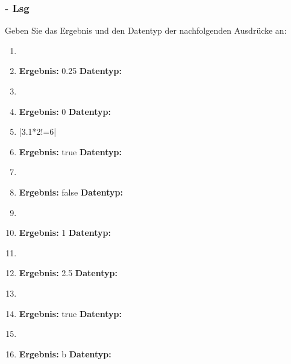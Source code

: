 \begin{frame}[t]%
    \frametitle{\stitle - Lsg}
Geben Sie das Ergebnis und den Datentyp der nachfolgenden Ausdr\"ucke an:
\begin{enumerate}
\item {}
\item[] {\bf Ergebnis: } 0.25 \hfill {\bf Datentyp: } 

\item {}
\item[] {\bf Ergebnis: } 0 \hfill {\bf Datentyp: } 

\item \code|3.1*2!=6|
\item[] {\bf Ergebnis: } true \hfill {\bf Datentyp: } 

\item {}
\item[] {\bf Ergebnis: } false \hfill {\bf Datentyp: } 

\item {}
\item[] {\bf Ergebnis: } 1 \hfill {\bf Datentyp: } 

\item {}
\item[] {\bf Ergebnis: } 2.5 \hfill {\bf Datentyp: } 

\item {}
\item[] {\bf Ergebnis: } true \hfill {\bf Datentyp: } 

\item {}
\item[] {\bf Ergebnis: } b \hfill {\bf Datentyp: } 
\end{enumerate}
\end{frame}
